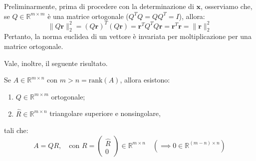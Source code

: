 Preliminarmente, prima di procedere con la determinazione di $\mathbf{x}$, osserviamo che, se $Q \in \mathbb{R}^{m \times m}$ è una matrice ortogonale ($Q^T Q = Q Q^T = I$), allora:
$$ \| Q \mathbf{r} \|_2^2 = (Q\mathbf{r})^T (Q\mathbf{r}) = \mathbf{r}^T Q^T Q \mathbf{r} = \mathbf{r}^T \mathbf{r} = \| \mathbf{r} \|_2^2 $$
Pertanto, la norma euclidea di un vettore è invariata per moltiplicazione per una matrice ortogonale.

Vale, inoltre, il seguente risultato.
\begin{teorema}[Fattorizzazione QR]
Se $A \in \mathbb{R}^{m \times n}$ con $m > n = \text{rank}(A)$, allora esistono:
\begin{enumerate}
    \item $Q \in \mathbb{R}^{m \times m}$ ortogonale;
    \item $\hat{R} \in \mathbb{R}^{m \times n}$ triangolare superiore e nonsingolare,
\end{enumerate}
tali che:
$$ A = Q R, \quad \text{con } R = \begin{pmatrix} \hat{R} \\ 0 \end{pmatrix} \in \mathbb{R}^{m \times n} \quad (\implies 0 \in \mathbb{R}^{(m-n) \times n}) $$
\end{teorema}

